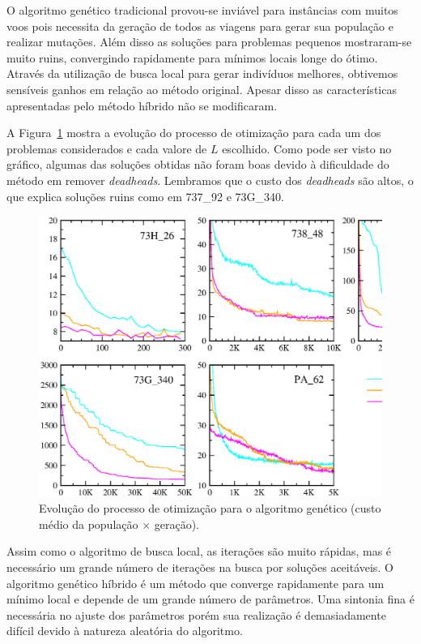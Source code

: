 O algoritmo genético tradicional provou-se inviável para instâncias com muitos voos pois necessita
da geração de todos as viagens para gerar sua população e realizar mutações. Além disso as soluções
para problemas pequenos mostraram-se muito ruins, convergindo rapidamente para mínimos locais longe
do ótimo. Através da utilização de busca local para gerar indivíduos melhores, obtivemos sensíveis
ganhos em relação ao método original. Apesar disso as características apresentadas pelo método
híbrido não se modificaram. 

A Figura~\ref{fig:ga_results} mostra a evolução do processo de otimização para cada um dos problemas
considerados e cada valore de $L$ escolhido. Como pode ser visto no gráfico, algumas das soluções
obtidas não foram boas devido à dificuldade do método em remover {\it deadheads}. Lembramos que o
custo dos {\it deadheads} são altos, o que explica soluções ruins como em 737\_92 e 73G\_340.

\begin{figure}[htbp]
	\begin{center}
		\includegraphics[scale=0.5]{fig/genetic_results.eps}
		\caption{Evolução do processo de otimização para o algoritmo genético (custo médio da população
		$\times$ geração).}
		\label{fig:ga_results}
	\end{center}
\end{figure}

Assim como o algoritmo de busca local, as iterações são muito rápidas, mas é necessário um grande
número de iterações na busca por soluções aceitáveis. O algoritmo genético híbrido é um método que
converge rapidamente para um mínimo local e depende de um grande número de parâmetros. Uma sintonia
fina é necessária no ajuste dos parâmetros porém sua realização é demasiadamente difícil devido à
natureza aleatória do algoritmo.

